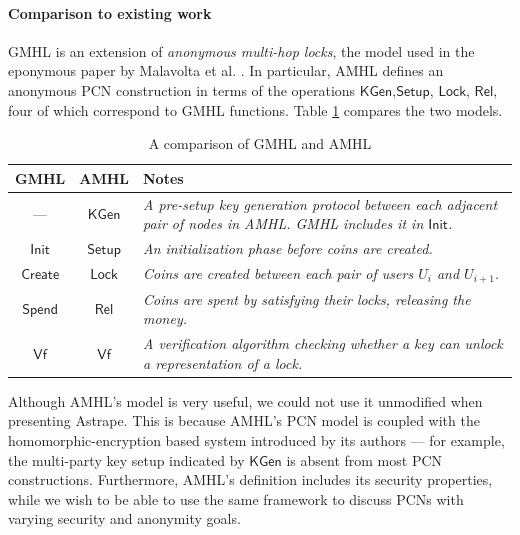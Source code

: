 \documentclass[USenglish,oneside,twocolumn]{article}
\begin{document}
\paragraph*{Comparison to existing work}

GMHL is an extension of \emph{anonymous multi-hop locks}, the model used in the eponymous paper by Malavolta et al. \cite{malavolta2019anonymous}. In particular, AMHL defines an anonymous PCN construction in terms of the operations $\mathsf{KGen}$,$\mathsf{Setup}$, $\mathsf{Lock}$, $\mathsf{Rel}$, four of which correspond to GMHL functions. Table \ref{tab:gmhlamhl} compares the two models.

\begin{table}[h]
    \centering
    \begin{tabular}{c c p{5cm}}
        \toprule
        GMHL              & AMHL             & Notes                                                                                                                        \\
        \midrule
        ---               & $\mathsf{KGen}$  & \emph{A pre-setup key generation protocol between each adjacent pair of nodes in AMHL. GMHL includes it in $\mathsf{Init}$.} \\
        $\mathsf{Init}$   & $\mathsf{Setup}$ & \emph{An initialization phase before coins are created.}                                                                     \\
        $\mathsf{Create}$ & $\mathsf{Lock}$  & \emph{Coins are created between each pair of users $U_{i}$ and $U_{i+1}$.}                                                   \\
        $\mathsf{Spend}$  & $\mathsf{Rel}$   & \emph{Coins are spent by satisfying their locks, releasing the money.}                                                       \\
        $\mathsf{Vf}$     & $\mathsf{Vf}$    & \emph{A verification algorithm checking whether a key can unlock a representation of a lock.}                                \\
        \bottomrule
    \end{tabular}
    \caption{A comparison of GMHL and AMHL}
    \label{tab:gmhlamhl}
\end{table}

Although AMHL's model is very useful, we could not use it unmodified when presenting Astrape. This is because AMHL's PCN model is coupled with the homomorphic-encryption based system introduced by its authors --- for example, the multi-party key setup indicated by $\mathsf{KGen}$ is absent from most PCN constructions. Furthermore, AMHL's definition includes its security properties, while we wish to be able to use the same framework to discuss PCNs with varying security and anonymity goals.
\end{document}
